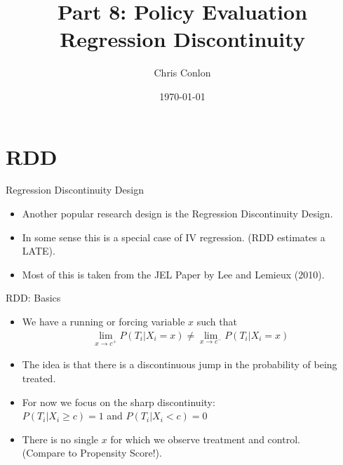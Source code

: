 \documentclass[xcolor=pdftex,dvipsnames,table,mathserif,aspectratio=169]{beamer}
\begin{document}
\title{Part 8: Policy Evaluation\\
 Regression Discontinuity}
\author{Chris Conlon}
\date{\today}

\frame{\titlepage}
\section*{RDD}
\begin{frame}{Regression Discontinuity Design}
\begin{itemize}
\item Another popular research design is the \alert{Regression Discontinuity Design}.
\item In some sense this is a special case of IV regression. (RDD estimates a LATE).
\item Most of this is taken from the JEL Paper by Lee and Lemieux (2010).
\end{itemize}              
\end{frame}

\begin{frame}{RDD: Basics}
\begin{itemize}
\item We have a \alert{running or forcing variable} $x$ such that 
\begin{eqnarray*}
\lim_{x\rightarrow c^{+}} P(T_i | X_i = x) \neq \lim_{x\rightarrow c^{-}}P(T_i | X_i = x)
\end{eqnarray*}
\item The idea is that there is a \alert{discontinuous jump} in the \alert{probability of being treated}.
\item For now we focus on the \alert{sharp discontinuity}:\\
 $P(T_i | X_i \geq c) =1$ and $P(T_i | X_i < c) =0$
 \item There is no single $x$ for which we observe treatment and control.\\
  (Compare to Propensity Score!).
\end{itemize}              
\end{frame}
\end{document}
